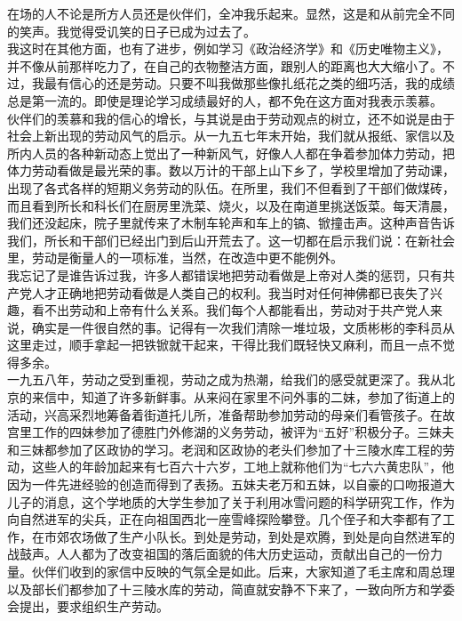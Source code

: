 在场的人不论是所方人员还是伙伴们，全冲我乐起来。显然，这是和从前完全不同的笑声。我觉得受讥笑的日子已成为过去了。\\

我这时在其他方面，也有了进步，例如学习《政治经济学》和《历史唯物主义》，并不像从前那样吃力了，在自己的衣物整洁方面，跟别人的距离也大大缩小了。不过，我最有信心的还是劳动。只要不叫我做那些像扎纸花之类的细巧活，我的成绩总是第一流的。即使是理论学习成绩最好的人，都不免在这方面对我表示羡慕。\\

伙伴们的羡慕和我的信心的增长，与其说是由于劳动观点的树立，还不如说是由于社会上新出现的劳动风气的启示。从一九五七年末开始，我们就从报纸、家信以及所内人员的各种新动态上觉出了一种新风气，好像人人都在争着参加体力劳动，把体力劳动看做是最光荣的事。数以万计的干部上山下乡了，学校里增加了劳动课，出现了各式各样的短期义务劳动的队伍。在所里，我们不但看到了干部们做煤砖，而且看到所长和科长们在厨房里洗菜、烧火，以及在南道里挑送饭菜。每天清晨，我们还没起床，院子里就传来了木制车轮声和车上的镐、锨撞击声。这种声音告诉我们，所长和干部们已经出门到后山开荒去了。这一切都在启示我们说：在新社会里，劳动是衡量人的一项标准，当然，在改造中更不能例外。\\

我忘记了是谁告诉过我，许多人都错误地把劳动看做是上帝对人类的惩罚，只有共产党人才正确地把劳动看做是人类自己的权利。我当时对任何神佛都已丧失了兴趣，看不出劳动和上帝有什么关系。我们每个人都能看出，劳动对于共产党人来说，确实是一件很自然的事。记得有一次我们清除一堆垃圾，文质彬彬的李科员从这里走过，顺手拿起一把铁锨就干起来，干得比我们既轻快又麻利，而且一点不觉得多余。\\

一九五八年，劳动之受到重视，劳动之成为热潮，给我们的感受就更深了。我从北京的来信中，知道了许多新鲜事。从来闷在家里不问外事的二妹，参加了街道上的活动，兴高采烈地筹备着街道托儿所，准备帮助参加劳动的母亲们看管孩子。在故宫里工作的四妹参加了德胜门外修湖的义务劳动，被评为“五好”积极分子。三妹夫和三妹都参加了区政协的学习。老润和区政协的老头们参加了十三陵水库工程的劳动，这些人的年龄加起来有七百六十六岁，工地上就称他们为“七六六黄忠队”，他因为一件先进经验的创造而得到了表扬。五妹夫老万和五妹，以自豪的口吻报道大儿子的消息，这个学地质的大学生参加了关于利用冰雪问题的科学研究工作，作为向自然进军的尖兵，正在向祖国西北一座雪峰探险攀登。几个侄子和大李都有了工作，在市郊农场做了生产小队长。到处是劳动，到处是欢腾，到处是向自然进军的战鼓声。人人都为了改变祖国的落后面貌的伟大历史运动，贡献出自己的一份力量。伙伴们收到的家信中反映的气氛全是如此。后来，大家知道了毛主席和周总理以及部长们都参加了十三陵水库的劳动，简直就安静不下来了，一致向所方和学委会提出，要求组织生产劳动。\\

